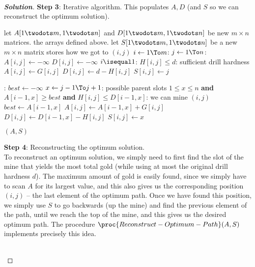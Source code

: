 \documentclass[a4paper,twoside,10pt]{report}
\newcommand{\marginline}{\noindent\makebox[\linewidth][r]{\rule{\textwidth}{1pt}}}
\newcommand{\exer}[1]{\noindent{\Large\textsc{Question #1}} \\ \marginline}
\newenvironment{soln}{\begin{proof}[\textit{\textbf{Solution}}]}{\\ \end{proof}}
\newenvironment{exercise}[1]{\exer{#1}}{}
\begin{document}
\begin{exercise}{2}
\begin{soln}
\noindent\textbf{Step 3}: Iterative algorithm. This populates $A, D$ (and $S$ so we can reconstruct the optimum solution).
\begin{codebox}
\li let $A[1 \twodots m, 1 \twodots n]$ and $D[1 \twodots m, 1 \twodots n]$ be new $m \times n$ matrices. \Comment the arrays defined above.
\li let $S[1\twodots m, 1\twodots n]$ be a new $m \times n$ matrix \Comment stores how we got to $(i, j)$
\li \For $i \gets 1 \To m$: \Do
\li     \For $j \gets 1 \To n$: \Do
\li         $A[i, j] \gets -\infty$
\li         $D[i, j] \gets -\infty$ 
\li         \If $i \isequal 1$: \Then
\li             \If $H[i, j] \leq d$: \Comment sufficient drill hardness\Then
\li                 $A[i, j] \gets G[i, j]$
\li                 $D[i, j] \gets d - H[i, j]$
\li                 $S[i, j] \gets j$
                

            \End
\li         \Else:
\li             $best \gets -\infty$
\li             \For $x \gets j - 1\To j + 1$: \Comment possible parent slots\Do 
\li                 \If $1 \leq x \leq n$ \textbf{and} $A[i - 1, x] \geq best$ \textbf{and} $H[i, j] \leq D[i-1, x]$: \Comment we can mine $(i, j)$\Then
\li                     $best \gets A[i - 1, x]$
\li              
$A[i, j] \gets A[i - 1, x] + G[i, j]$
\li             $D[i, j] \gets D[i - 1, x] - H[i, j]$
\li             $S[i, j] \gets x$
                    \End
                \End

            \End

        \End
    \End
            
\li \Return $(A, S)$

\end{codebox}
\newpage
\noindent\textbf{Step 4}: Reconstructing the optimum solution. \\

To reconstruct an optimum solution, we simply need to first find the slot of the mine that yields the most total gold (while using at most the original drill hardness $d$). The maximum amount of gold is easily found, since we simply have to scan $A$ for its largest value, and this also gives us the corresponding position $(i, j)$ -- the last element of the optimum path. Once we have found this position, we simply use $S$ to go backwards (up the mine) and find the previous element of the path, until we reach the top of the mine, and this gives us the desired optimum path. The procedure $\proc{Reconstruct-Optimum-Path}(A, S)$ implements precisely this idea.


\end{soln}
\end{exercise}
\end{document}
